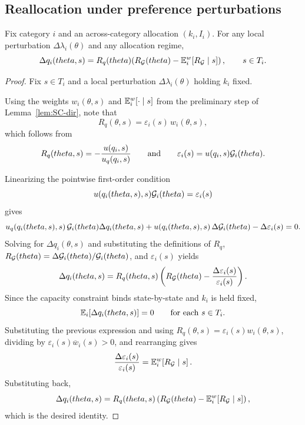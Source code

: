 \documentclass[master.tex]{subfiles}
\begin{document}
\subsection{Reallocation under preference perturbations}

\begin{lemma}\label{lem:realloc}
Fix category \(i\) and an across-category allocation \((k_i,I_i)\). For any local perturbation $\Delta\lambda_i(\theta)$ and any allocation regime,
\[
\Delta q_i(theta,s) = R_q(theta)\!\left(R_{\mathcal{G}}(theta) - \mathbb{E}^w_i\!\left[R_{\mathcal{G}}\mid s\right]\right), \qquad s\in T_i.
\]
\end{lemma}

\begin{proof}
Fix $s\in T_i$ and a local perturbation $\Delta\lambda_i(\theta)$ holding $k_i$ fixed.

Using the weights $w_i(\theta,s)$ and $\mathbb{E}_i^w[\cdot\mid s]$ from the preliminary step of Lemma~\ref{lem:SC-dir}, note that
\[
R_q(\theta,s)=\varepsilon_i(s)\,w_i(\theta,s),
\]
which follows from
\[
R_q(theta,s)=
-\frac{u(q_i,s)}{u_q(q_i,s)}
\qquad\text{and}\qquad
\varepsilon_i(s)=u(q_i,s)\mathcal{G}_i(theta).
\]

Linearizing the pointwise first-order condition
\[
u(q_i(theta,s),s)\mathcal{G}_i(theta)=\varepsilon_i(s)
\]
gives
\[
u_q\!\left(q_i(theta,s),s\right)\mathcal{G}_i(theta)\Delta q_i(theta,s)
+
u\!\left(q_i(theta,s),s\right)\Delta\mathcal{G}_i(theta)
-
\Delta\varepsilon_i(s)
=
0.
\]
Solving for $\Delta q_i(\theta,s)$ and substituting the definitions of $R_q$, $R_{\mathcal{G}}(theta)=\Delta\mathcal{G}_i(theta)/\mathcal{G}_i(theta)$, and $\varepsilon_i(s)$ yields
\[
\Delta q_i(theta,s)
=
R_q(theta,s)
\left(
R_{\mathcal{G}}(theta)
-
\frac{\Delta\varepsilon_i(s)}{\varepsilon_i(s)}
\right).
\]
Since the capacity constraint binds state-by-state and $k_i$ is held fixed,
\[
\mathbb{E}_i\!\left[\Delta q_i(theta,s)\right]=0
\qquad
\text{for each }s\in T_i.
\]
Substituting the previous expression and using $R_q(\theta,s)=\varepsilon_i(s)w_i(\theta,s)$, dividing by $\varepsilon_i(s)\overline w_i(s)>0$, and rearranging gives
\[
\frac{\Delta\varepsilon_i(s)}{\varepsilon_i(s)}
=
\mathbb{E}_i^w\!\left[R_{\mathcal{G}}\mid s\right].
\]
Substituting back,
\[
\Delta q_i(theta,s)
=
R_q(theta,s)
\left(
R_{\mathcal{G}}(theta)-\mathbb{E}_i^w\!\left[R_{\mathcal{G}}\mid s\right]
\right),
\]
which is the desired identity.
\end{proof}



\end{document}
